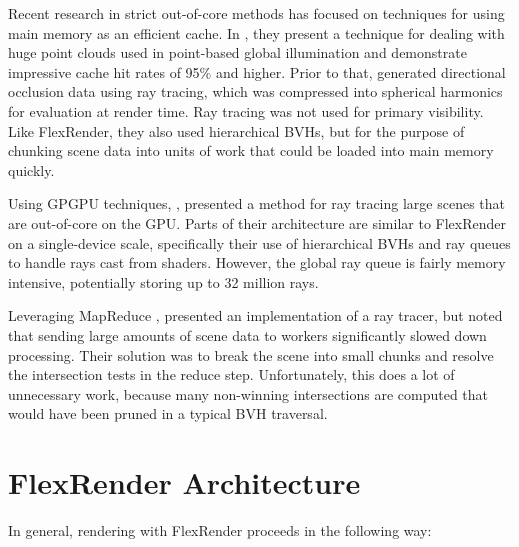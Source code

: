 \documentclass[a4paper,twoside]{article}
\begin{document}
Recent research in strict out-of-core methods has focused on techniques for
using main memory as an efficient cache. In \cite{tabellion:2011}, they present
a technique for dealing with huge point clouds used in point-based global
illumination and demonstrate impressive cache hit rates of 95\% and higher.
Prior to that, \cite{pantaleoni:2010} generated directional occlusion data
using ray tracing, which was compressed into spherical harmonics for evaluation
at render time. Ray tracing was not used for primary visibility. Like FlexRender,
they also used hierarchical BVHs, but for the purpose of chunking scene data
into units of work that could be loaded into main memory quickly.

Using GPGPU techniques, \cite{garanzha:2011}, presented a method for ray
tracing large scenes that are out-of-core on the GPU. Parts of their
architecture are similar to FlexRender on a single-device scale, specifically
their use of hierarchical BVHs and ray queues to handle rays cast from shaders.
However, the global ray queue is fairly memory intensive, potentially storing
up to 32 million rays.

Leveraging MapReduce \cite{dean:2004}, \cite{northam:2011} presented an
implementation of a ray tracer, but noted that sending large amounts of scene
data to workers significantly slowed down processing. Their solution was to
break the scene into small chunks and resolve the intersection tests in the
reduce step. Unfortunately, this does a lot of unnecessary work, because many
non-winning intersections are computed that would have been pruned in a typical
BVH traversal.

\section{FlexRender Architecture}
\label{architecture}

In general, rendering with FlexRender proceeds in the following way:
\end{document}
